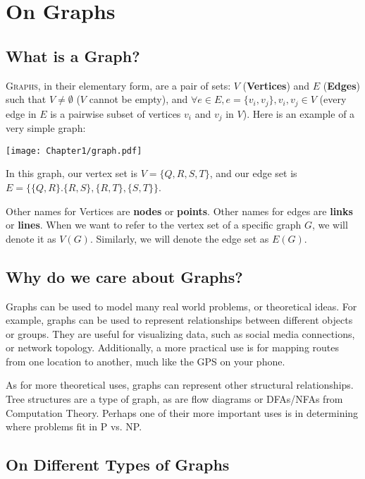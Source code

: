 \chapter{On Graphs}
\section{What is a Graph?}
\lettrine[lines=4]{G}{raphs}, in their elementary form, are a pair of sets: $V$ (\textbf{Vertices}) and $E$ (\textbf{Edges}) such that $V \neq \emptyset$ ($V$ cannot be empty), and $\forall e \in E, e = \{v_i, v_j\}, v_i, v_j \in V$ (every edge in $E$ is a pairwise subset of vertices $v_i$ and $v_j$ in $V$). Here is an example of a very simple graph:

\begin{center}
    \texttt{[image: Chapter1/graph.pdf]}
\end{center}

In this graph, our vertex set is $V = \{Q, R, S, T\}$, and our edge set is $E = \big\{\{Q, R\}. \{R, S\}, \{R, T\}, \{S,T\}\big\}$.

Other names for Vertices are \textbf{nodes} or \textbf{points}. Other names for edges are \textbf{links} or \textbf{lines}. When we want to refer to the vertex set of a specific graph $G$, we will denote it as $V(G)$. Similarly, we will denote the edge set as $E(G)$.
\section{Why do we care about Graphs?}
Graphs can be used to model many real world problems, or theoretical ideas. For example, graphs can be used to represent relationships between different objects or groups. They are useful for visualizing data, such as social media connections, or network topology. Additionally, a more practical use is for mapping routes from one location to another, much like the GPS on your phone.

As for more theoretical uses, graphs can represent other structural relationships. Tree structures are a type of graph, as are flow diagrams or DFAs/NFAs from Computation Theory. Perhaps one of their more important uses is in determining where problems fit in P vs. NP.

\section{On Different Types of Graphs}
